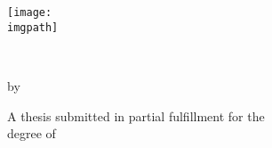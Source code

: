 \begin{titlepage}
	\begin{center}

		\texttt{[image: \\imgpath]} \\

		{
		\textbf
		\university
		\\
		\smallskip
		\faculty
		\par
		}

		\vspace{6\baselineskip}

		{
			\huge
			\scshape
			\thesistitle
			\par
		}

		\vspace{6\baselineskip}

		\vfill
		{\large by \par}
		\smallskip
		{\Large \name \par}
		\vfill
		{ A thesis submitted in partial fulfillment for the \\ degree of \degree \par}
		\vfill

		{\large \titledate \par}
		\bigskip

	\end{center}
\end{titlepage}
\cleardoublepage\par
